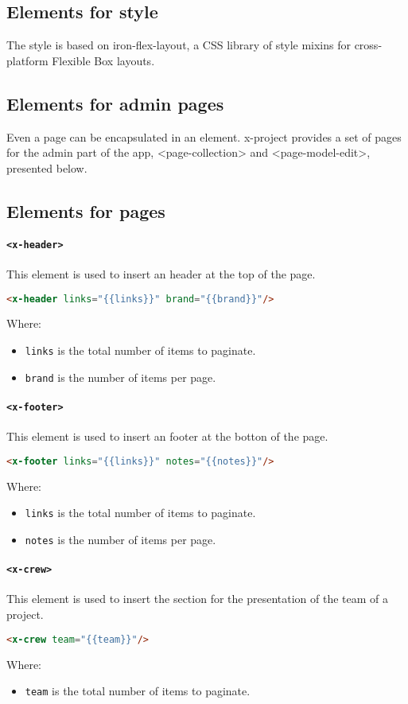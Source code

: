 \subsection{Elements for style}

The style is based on iron-flex-layout, a CSS library of style mixins for cross-platform Flexible Box layouts.

\subsection{Elements for admin pages}

Even a page can be encapsulated in an element. x-project provides a set of pages for the admin part of the app, <page-collection> and <page-model-edit>, presented below.

\subsection{Elements for pages}

\paragraph{\texttt{<x-header>}} This element is used to insert an header at the top of the page.
\begin{lstlisting}[language=html]
<x-header links="{{links}}" brand="{{brand}}"/>
\end{lstlisting}
Where:
\begin{itemize}
\item \texttt{links} is the total number of items to paginate.
\item \texttt{brand} is the number of items per page.
\end{itemize}
\paragraph{\texttt{<x-footer>}} This element is used to insert an footer at the botton of the page.
\begin{lstlisting}[language=html]
<x-footer links="{{links}}" notes="{{notes}}"/>
\end{lstlisting}
Where:
\begin{itemize}
\item \texttt{links} is the total number of items to paginate.
\item \texttt{notes} is the number of items per page.
\end{itemize}
\paragraph{\texttt{<x-crew>}} This element is used to insert the section for the presentation of the team of a project.
\begin{lstlisting}[language=html]
<x-crew team="{{team}}"/>\end{lstlisting}
Where:
\begin{itemize}
\item \texttt{team} is the total number of items to paginate.
\end{itemize}
